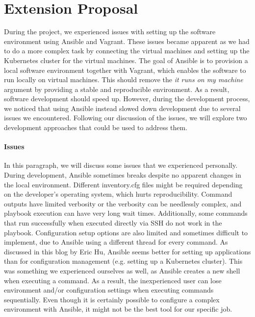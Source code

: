 \section{Extension Proposal}
During the project, we experienced issues with setting up the software environment using Ansible and Vagrant. These issues became apparent as we had to do a more complex task by connecting the virtual machines and setting up the Kubernetes cluster for the virtual machines. The goal of Ansible is to provision a local software environment together with Vagrant, which enables the software to run locally on virtual machines. This should remove the \textit{it runs on my machine} argument by providing a stable and reproducible environment. As a result, software development should speed up. However, during the development process, we noticed that using Ansible instead slowed down development due to several issues we encountered. Following our discussion of the issues, we will explore two development approaches that could be used to address them.

\paragraph{Issues}
In this paragraph, we will discuss some issues that we experienced personally. During development, Ansible sometimes breaks despite no apparent changes in the local environment. Different inventory.cfg files might be required depending on the developer's operating system, which hurts reproducibility. Command outputs have limited verbosity or the verbosity can be needlessly complex, and playbook execution can have very long wait times\cite{ansible-slow}. Additionally, some commands that run successfully when executed directly via SSH do not work in the playbook. Configuration setup options are also limited and sometimes difficult to implement, due to Ansible using a different thread for every command. As discussed in this blog by Eric Hu, Ansible seems better for setting up applications than for configuration management (e.g. setting up a Kubernetes cluster)\cite{ansible-comparison}. This was something we experienced ourselves as well, as Ansible creates a new shell when executing a command. As a result, the inexperienced user can lose environment and/or configuration settings when executing commands sequentially\cite{ansible-shell}. Even though it is certainly possible to configure a complex environment with Ansible, it might not be the best tool for our specific job.

